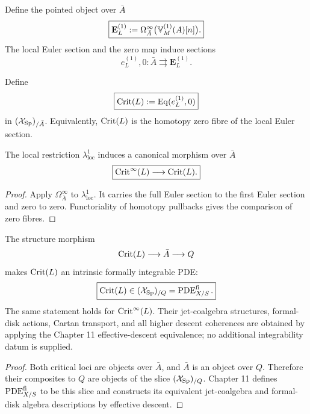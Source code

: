 \begin{definition}
\label{def:var-first-moduli}
Define the pointed object over \(\bar A\)
\[
    \boxed{
    \mathbf E_L^{(1)}
    :=
    \Omega_{\bar A}^\infty\bigl(\mathbb V^{(1)}_M(A)[n]\bigr).
    }
\]
The local Euler section and the zero map induce sections
\[
    e_L^{(1)},0:\bar A\rightrightarrows\mathbf E_L^{(1)}.
\]
\end{definition}

\begin{definition}
\label{def:var-critical-locus}
Define
\[
    \boxed{
    \operatorname{Crit}(L)
    :=
    \operatorname{Eq}(e_L^{(1)},0)
    }
\]
in \((\mathcal{X}_{\mathrm{Sp}})_{/\bar A}\). Equivalently, \(\operatorname{Crit}(L)\) is the homotopy zero fibre of the local Euler section.
\end{definition}

\begin{proposition}
\label{prop:var-critical-comparison}
The local restriction \(\lambda^1_{\mathrm{loc}}\) induces a canonical morphism over \(\bar A\)
\[
    \boxed{
    \operatorname{Crit}^{\infty}(L)
    \longrightarrow
    \operatorname{Crit}(L).
    }
\]
\end{proposition}

\begin{proof}
Apply \(\Omega_{\bar A}^\infty\) to \(\lambda^1_{\mathrm{loc}}\). It carries the full Euler section to the first Euler section and zero to zero. Functoriality of homotopy pullbacks gives the comparison of zero fibres.
\end{proof}

\begin{theorem}
\label{thm:var-critical-intrinsic-pde}
The structure morphism
\[
    \operatorname{Crit}(L)\longrightarrow\bar A\longrightarrow Q
\]
makes \(\operatorname{Crit}(L)\) an intrinsic formally integrable PDE:
\[
    \boxed{
    \operatorname{Crit}(L)\in(\mathcal{X}_{\mathrm{Sp}})_{/Q}=\operatorname{PDE}^{\mathrm{fi}}_{X/S}.
    }
\]
The same statement holds for \(\operatorname{Crit}^{\infty}(L)\). Their jet-coalgebra structures, formal-disk actions, Cartan transport, and all higher descent coherences are obtained by applying the Chapter 11 effective-descent equivalence; no additional integrability datum is supplied.
\end{theorem}

\begin{proof}
Both critical loci are objects over \(\bar A\), and \(\bar A\) is an object over \(Q\). Therefore their composites to \(Q\) are objects of the slice \((\mathcal{X}_{\mathrm{Sp}})_{/Q}\). Chapter 11 defines \(\operatorname{PDE}^{\mathrm{fi}}_{X/S}\) to be this slice and constructs its equivalent jet-coalgebra and formal-disk algebra descriptions by effective descent.
\end{proof}

